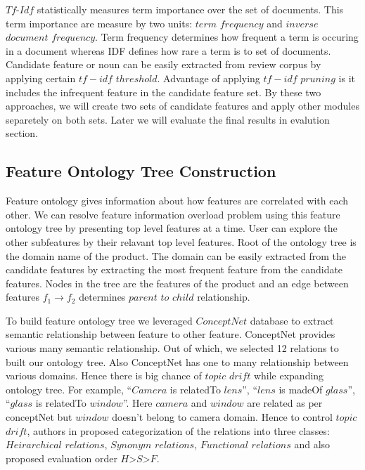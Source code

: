 $Tf$-$Idf$ statistically measures term importance over the set of documents. This term importance are measure by two units: $term$ $frequency$ and $inverse$ $document$ $frequency$. Term frequency determines how frequent a term is occuring in a document whereas IDF defines how rare a term is to set of documents. Candidate feature or noun can be easily extracted from review corpus by applying certain $tf-idf$ $threshold$. Advantage of applying $tf-idf$ $pruning$ is it includes the infrequent feature in the candidate feature set. By these two approaches, we will create two sets of candidate features and apply other modules separetely on both sets. Later we will evaluate the final results in evalution section.     

\subsection{Feature Ontology Tree Construction}
Feature ontology gives information about how features are correlated with each other. We can resolve feature information overload problem using this feature ontology tree by presenting top level features at a time. User can explore the other subfeatures by their relavant top level features. Root of the ontology tree is the domain name of the product. The domain can be easily extracted from the candidate features by extracting the most frequent feature from the candidate features. Nodes in the tree are the features of the product and an edge between features $f_{1} \rightarrow f_{2}$ determines $parent$ $to$ $child$ relationship.

To build feature ontology tree we leveraged $ConceptNet$ database to extract semantic relationship between feature to other feature. 
ConceptNet provides various many semantic relationship. Out of which, we selected 12 relations to built our ontology tree. Also ConceptNet has one to many relationship between various domains. Hence there is big chance of $topic$ $drift$ while expanding ontology tree. For example, ``$Camera$ is relatedTo $lens$'', ``$lens$ is madeOf $glass$'', ``$glass$ is relatedTo $window$''. Here $camera$ and $window$ are related as per conceptNet but $window$ doesn't belong to camera domain. Hence to control $topic$ $drift$, authors in \cite{mukherjee2013sentiment} proposed categorization of the relations into three classes: $Heirarchical$ $relations$, $Synonym$ $relations$, $Functional$ $relations$ and also proposed evaluation order $H$>$S$>$F$.   

